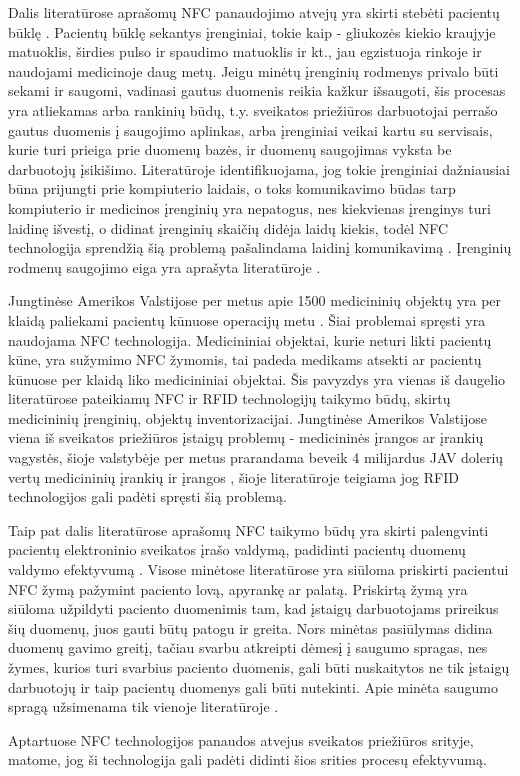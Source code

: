 Dalis literatūrose aprašomų NFC panaudojimo atvejų yra skirti stebėti pacientų būklę \cite{Strommer2006} \cite{Gautam} \cite{Zhang2011}. Pacientų būklę sekantys įrenginiai, tokie kaip - gliukozės kiekio kraujyje matuoklis, širdies pulso ir spaudimo matuoklis ir kt., jau egzistuoja rinkoje ir naudojami medicinoje daug metų. Jeigu minėtų įrenginių rodmenys privalo būti sekami ir saugomi, vadinasi gautus duomenis reikia kažkur išsaugoti, šis procesas yra atliekamas arba rankinių būdų, t.y. sveikatos priežiūros darbuotojai perrašo gautus duomenis į saugojimo aplinkas, arba įrenginiai veikai kartu su servisais, kurie turi prieiga prie duomenų bazės, ir duomenų saugojimas vyksta be darbuotojų įsikišimo. Literatūroje \cite{Strommer2006} identifikuojama, jog tokie įrenginiai dažniausiai būna prijungti prie kompiuterio laidais, o toks komunikavimo būdas tarp kompiuterio ir medicinos įrenginių yra nepatogus, nes kiekvienas įrenginys turi laidinę išvestį, o didinat įrenginių skaičių didėja laidų kiekis, todėl NFC technologija sprendžią šią problemą pašalindama laidinį komunikavimą \cite{Strommer2006}. Įrenginių rodmenų saugojimo eiga yra aprašyta literatūroje \cite{Zhang2011}.

Jungtinėse Amerikos Valstijose per metus apie 1500 medicininių objektų yra per klaidą paliekami pacientų kūnuose operacijų metu \cite{RamaKrishnaPrasad}. Šiai problemai spręsti yra naudojama NFC technologija. Medicininiai objektai, kurie neturi likti pacientų kūne, yra sužymimo NFC žymomis, tai padeda medikams atsekti ar pacientų kūnuose per klaidą liko medicininiai objektai. Šis pavyzdys yra vienas iš daugelio literatūrose \cite{Ajami2014} \cite{Puma2012} \cite{Azlina2013} pateikiamų NFC ir RFID technologijų taikymo būdų, skirtų medicininių įrenginių, objektų inventorizacijai. Jungtinėse Amerikos Valstijose viena iš sveikatos priežiūros įstaigų problemų - medicininės įrangos ar įrankių vagystės, šioje valstybėje per metus prarandama beveik 4 milijardus JAV dolerių vertų medicininių įrankių ir įrangos \cite{RamaKrishnaPrasad}, šioje literatūroje teigiama jog RFID technologijos gali padėti spręsti šią problemą.

Taip pat dalis literatūrose aprašomų NFC taikymo būdų yra skirti palengvinti pacientų elektroninio sveikatos įrašo valdymą, padidinti pacientų duomenų valdymo efektyvumą \cite{Gautam} \cite{RamaKrishnaPrasad} \cite{Fontecha2011} \cite{Davcev2015}. Visose minėtose literatūrose yra siūloma priskirti pacientui NFC žymą pažymint paciento lovą, apyrankę ar palatą. Priskirtą žymą yra siūloma užpildyti paciento duomenimis tam, kad įstaigų darbuotojams prireikus šių duomenų, juos gauti būtų patogu ir greita. Nors minėtas pasiūlymas didina duomenų gavimo greitį, tačiau svarbu atkreipti dėmesį į saugumo spragas, nes žymes, kurios turi svarbius paciento duomenis, gali būti nuskaitytos ne tik įstaigų darbuotojų ir taip pacientų duomenys gali būti nutekinti. Apie minėta saugumo spragą užsimenama tik vienoje literatūroje \cite{RamaKrishnaPrasad}.

Aptartuose NFC technologijos panaudos atvejus sveikatos priežiūros srityje, matome, jog ši technologija gali padėti didinti šios srities procesų efektyvumą.


